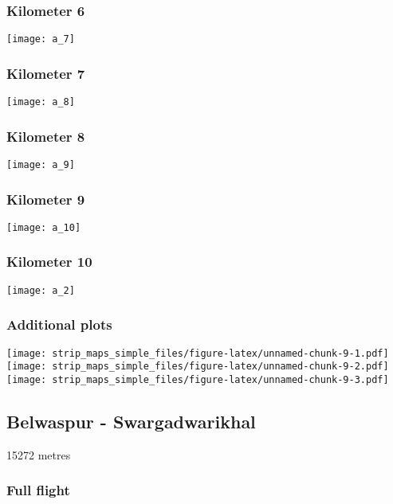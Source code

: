 \documentclass[]{article}
\begin{document}
\subsubsection{Kilometer 6}\label{kilometer-6}

\texttt{[image: a\_7]}

\subsubsection{Kilometer 7}\label{kilometer-7}

\texttt{[image: a\_8]}

\subsubsection{Kilometer 8}\label{kilometer-8}

\texttt{[image: a\_9]}

\subsubsection{Kilometer 9}\label{kilometer-9}

\texttt{[image: a\_10]}

\subsubsection{Kilometer 10}\label{kilometer-10}

\texttt{[image: a\_2]}

\subsubsection{Additional plots}\label{additional-plots}

\texttt{[image: strip\_maps\_simple\_files/figure-latex/unnamed-chunk-9-1.pdf]}
\texttt{[image: strip\_maps\_simple\_files/figure-latex/unnamed-chunk-9-2.pdf]}
\texttt{[image: strip\_maps\_simple\_files/figure-latex/unnamed-chunk-9-3.pdf]}

\newpage

\subsection{Belwaspur -
Swargadwarikhal}\label{belwaspur---swargadwarikhal}

15272 metres

\subsubsection{Full flight}\label{full-flight-1}
\end{document}

